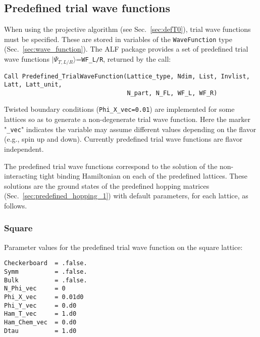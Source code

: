 

\subsection{Predefined trial wave functions} \label{sec:predefined_trial_wave_function}

When using the projective algorithm (see Sec.~\ref{sec:defT0}), trial wave functions must be specified.
These are stored in variables of the \texttt{WaveFunction} type (Sec.~\ref{sec:wave_function}).
The ALF package provides a set of predefined trial wave functions $|\Psi_{T,L/R}\rangle$=\texttt{WF\_L/R}, returned by the call:

\begin{lstlisting}[style=fortran]
Call Predefined_TrialWaveFunction(Lattice_type, Ndim, List, Invlist, Latt, Latt_unit,
                                  N_part, N_FL, WF_L, WF_R)
\end{lstlisting}
Twisted boundary conditions (\texttt{Phi\_X\_vec=0.01}) are implemented for some lattices so as to generate a non-degenerate trial wave function. Here the marker "\texttt{\_vec}" indicates the variable may assume different values depending on the flavor (e.g., spin up and down). Currently predefined trial wave functions are flavor independent.

The predefined trial wave functions correspond to the solution of the non-interacting tight binding Hamiltonian on each of the predefined lattices. These solutions are the ground states of the predefined hopping matrices (Sec.~\ref{sec:predefined_hopping_1}) with default parameters, for each lattice, as follows.

\subsubsection{Square}

Parameter values for the predefined trial wave function on the square lattice:
\begin{lstlisting}[style=fortran]
Checkerboard  = .false.
Symm          = .false.
Bulk          = .false.
N_Phi_vec     = 0
Phi_X_vec     = 0.01d0
Phi_Y_vec     = 0.d0
Ham_T_vec     = 1.d0
Ham_Chem_vec  = 0.d0
Dtau          = 1.d0
\end{lstlisting}


